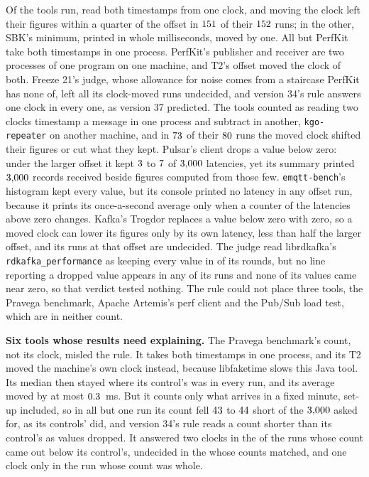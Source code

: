 \documentclass[10pt,journal,onecolumn]{IEEEtran}
\newcommand{\kafka}{Kafka}
\begin{document}
Of the tools run, \toolsOneClockWord{} read both timestamps from one clock, and moving the clock
left their figures within a quarter of the offset in $151$ of their
$152$ runs; in the other, SBK's minimum, printed in whole milliseconds, moved by one.
All but PerfKit take both timestamps in one process. PerfKit's publisher and receiver are two
processes of one program on one machine, and T2's offset moved the clock of both. Freeze 21's
judge, whose allowance for noise comes from a staircase PerfKit has none of, left all its
clock-moved runs undecided, and version 34's rule answers one clock in every one, as version 37
predicted. The \toolsTwoClockWord{} tools counted as reading two clocks timestamp a message in one
process and subtract in another, \texttt{kgo-repeater} on another machine, and in
$73$ of their $80$ runs the moved clock shifted their figures or cut
what they kept. Pulsar's client drops a value below zero: under the larger offset it kept
$3$ to $7$ of $3{,}000$ latencies, yet its summary
printed $3{,}000$ records received beside figures computed from those few.
\texttt{emqtt-bench}'s histogram kept every value, but its console printed no latency in any offset
run, because it prints its once-a-second average only when a counter of the latencies above zero
changes. \kafka{}'s Trogdor replaces a value below zero with zero, so a moved clock can lower its
figures only by its own latency, less than half the larger offset, and its runs at that offset are
undecided. The judge read librdkafka's \texttt{rdkafka\_performance} as keeping every value in
\toolsKeepsRoundsWord{} of its \toolsRoundsWord{} rounds, but no line reporting a dropped value
appears in any of its runs and none of its values came near zero, so that verdict tested nothing.
The rule could not place three tools, the Pravega benchmark, Apache Artemis's perf client and the
Pub/Sub load test, which are in neither count.

\textbf{Six tools whose results need explaining.} The Pravega benchmark's count, not its clock,
misled the rule. It takes both timestamps in one process, and its T2 moved the machine's own clock
instead, because libfaketime slows this Java tool. Its median then stayed where its control's was in
every run, and its average moved by at most $0.3$~ms. But it counts only what arrives in a fixed
minute, set-up included, so in all but one run its count fell $43$ to
$44$ short of the $3{,}000$ asked for, as its controls' did, and version
34's rule reads a count shorter than its control's as values dropped. It answered two clocks in the
\toolsCountedTwoWord{} of the \toolsCountedRunsWord{} runs whose count came out
\toolsPravegaBelowControlWord{} below its control's, undecided in the \toolsCountedUndecidedWord{}
whose counts matched, and one clock only in the \toolsCountedOneWord{} run whose count was whole.
\end{document}
